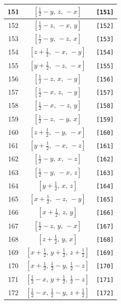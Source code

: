 \documentclass[fleqn,8pt]{jsarticle}
\begin{document}
\begin{longtable}{ccc}
151 & $\left[ \frac{1}{2} - y,\, z,\, - x \right]$ & {\tt [151]} \\ \hline
152 & $\left[ \frac{1}{2} - z,\, - x,\, y \right]$ & {\tt [152]} \\ \hline
153 & $\left[ \frac{1}{2} - y,\, - z,\, x \right]$ & {\tt [153]} \\ \hline
154 & $\left[ z + \frac{1}{2},\, - x,\, - y \right]$ & {\tt [154]} \\ \hline
155 & $\left[ y + \frac{1}{2},\, - z,\, - x \right]$ & {\tt [155]} \\ \hline
156 & $\left[ \frac{1}{2} - z,\, x,\, - y \right]$ & {\tt [156]} \\ \hline
157 & $\left[ \frac{1}{2} - x,\, z,\, - y \right]$ & {\tt [157]} \\ \hline
158 & $\left[ \frac{1}{2} - x,\, - z,\, y \right]$ & {\tt [158]} \\ \hline
159 & $\left[ \frac{1}{2} - z,\, - y,\, x \right]$ & {\tt [159]} \\ \hline
160 & $\left[ z + \frac{1}{2},\, - y,\, - x \right]$ & {\tt [160]} \\ \hline
161 & $\left[ y + \frac{1}{2},\, - x,\, - z \right]$ & {\tt [161]} \\ \hline
162 & $\left[ \frac{1}{2} - y,\, x,\, - z \right]$ & {\tt [162]} \\ \hline
163 & $\left[ \frac{1}{2} - y,\, - x,\, z \right]$ & {\tt [163]} \\ \hline
164 & $\left[ y + \frac{1}{2},\, x,\, z \right]$ & {\tt [164]} \\ \hline
165 & $\left[ x + \frac{1}{2},\, - z,\, - y \right]$ & {\tt [165]} \\ \hline
166 & $\left[ x + \frac{1}{2},\, z,\, y \right]$ & {\tt [166]} \\ \hline
167 & $\left[ \frac{1}{2} - z,\, y,\, - x \right]$ & {\tt [167]} \\ \hline
168 & $\left[ z + \frac{1}{2},\, y,\, x \right]$ & {\tt [168]} \\ \hline
169 & $\left[ x + \frac{1}{2},\, y + \frac{1}{2},\, z + \frac{1}{2} \right]$ & {\tt [169]} \\ \hline
170 & $\left[ x + \frac{1}{2},\, \frac{1}{2} - y,\, \frac{1}{2} - z \right]$ & {\tt [170]} \\ \hline
171 & $\left[ \frac{1}{2} - x,\, y + \frac{1}{2},\, \frac{1}{2} - z \right]$ & {\tt [171]} \\ \hline
172 & $\left[ \frac{1}{2} - x,\, \frac{1}{2} - y,\, z + \frac{1}{2} \right]$ & {\tt [172]} \\ \hline

\end{longtable}
\end{document}
